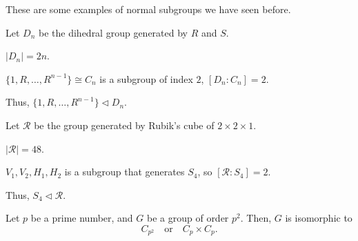 \begin{example}
    These are some examples of normal subgroups we have seen before.

    \begin{listo}
        \item Let $D_n$ be the dihedral group generated by $R$ and $S$. 
        
        $| D_n | = 2n$. 
        
        $\{ 1, R, \dots, R^{n-1} \} \cong C_n$ is a subgroup of index $2$, $[D_n : C_n] = 2$.

        Thus, $\{ 1, R, \dots, R^{n-1} \} \triangleleft D_n$.

        \item Let $\mathcal{R}$ be the group generated by Rubik's cube of $2 \times 2 \times 1$. 
        
        $| \mathcal{R} | = 48$.

        $V_1, V_2, H_1, H_2$ is a subgroup that generates $S_4$, so $[ \mathcal{R} : S_4 ] = 2$.

        Thus, $S_4 \triangleleft \mathcal{R}$.
    \end{listo}
\end{example}

\begin{theorem}
    Let $p$ be a prime number, and $G$ be a group of order $p^2$. Then, $G$ is isomorphic to \[
        C_{p^2} \quad \text{or} \quad C_p \times C_p.
    \]
\end{theorem}

